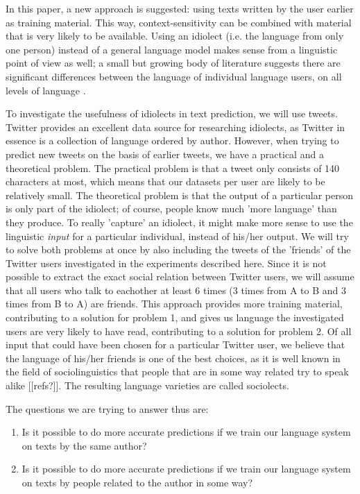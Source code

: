 \documentclass[11pt]{article}
\begin{document}
In this paper, a new approach is suggested: using texts written by the user earlier as training material. This way, context-sensitivity can be combined with material that is very likely to be available. Using an idiolect (i.e. the language from only one person) instead of a general language model makes sense from a linguistic point of view as well; a small but growing body of literature suggests there are significant differences between the language of individual language users, on all levels of language \cite[among others]{mollin09,barlow10}.

To investigate the usefulness of idiolects in text prediction, we will use tweets. Twitter provides an excellent data source for researching idiolects, as Twitter in essence is a collection of language ordered by author. However, when trying to predict new tweets on the basis of earlier tweets, we have a practical and a theoretical problem. The practical problem is that a tweet only consists of 140 characters at most, which means that our datasets per user are likely to be relatively small. The theoretical problem is that the output of a particular person is only part of the idiolect; of course, people know much 'more language' than they produce. To really 'capture' an idiolect, it might make more sense to use the linguistic \emph{input} for a particular individual, instead of his/her output. We will try to solve both problems at once by also including the tweets of the 'friends' of the Twitter users investigated in the experiments described here. Since it is not possible to extract the exact social relation between Twitter users, we will assume that all users who talk to eachother at least 6 times (3 times from A to B and 3 times from B to A) are friends. This approach provides more training material, contributing to a solution for problem 1, and gives us language the investigated users are very likely to have read, contributing to a solution for problem 2. Of all input that could have been chosen for a particular Twitter user, we believe that the language of his/her friends is one of the best choices, as it is well known in the field of sociolinguistics that people that are in some way related try to speak alike [[refs?]]. The resulting language varieties are called sociolects.

The questions we are trying to answer thus are:

\begin{enumerate}
\item Is it possible to do more accurate predictions if we train our language system on texts by the same author?
\item Is it possible to do more accurate predictions if we train our language system on texts by people related to the author in some way?
\end{enumerate}
\end{document}
